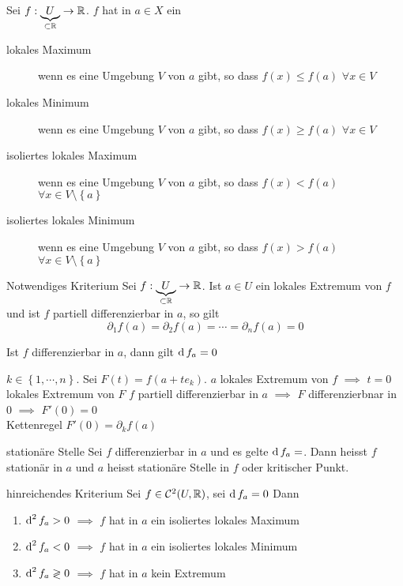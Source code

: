 \begin{Def}
  Sei $f:\underbrace{U}_{\subset\mathbb{R}}\to \mathbb{R}$. $f$ hat in $a\in X$ ein
  \begin{description}
    \item[lokales Maximum] wenn es eine Umgebung $V$ von $a$ gibt, so dass $f(x)\leq f(a)$ $\forall x\in V$
    \item[lokales Minimum] wenn es eine Umgebung $V$ von $a$ gibt, so dass $f(x)\geq f(a)$ $\forall x\in V$
    \item[isoliertes lokales Maximum] wenn es eine Umgebung $V$ von $a$ gibt, so dass $f(x)<f(a)$ $\forall x\in V\setminus \left\{ a \right\}$
    \item[isoliertes lokales Minimum] wenn es eine Umgebung $V$ von $a$ gibt, so dass $f(x)>f(a)$ $\forall x\in V\setminus\left\{ a \right\}$
  \end{description}
\end{Def}
\begin{Sat}{Notwendiges Kriterium}
  Sei $f:\underbrace{U}_{\subset\mathbb{R}}\to \mathbb{R}$. Ist $a\in U$ ein lokales Extremum von $f$ und ist $f$ partiell differenzierbar in $a$, so gilt
  \[\partial_1f(a)=\partial_2f(a)=\cdots=\partial_nf(a)=0\]
\end{Sat}
\begin{Bem}
  Ist $f$ differenzierbar in $a$, dann gilt $\operatorname{d} f_a=0$
\end{Bem}
\begin{Bew}
  $k\in \left\{ 1,\cdots,n \right\}$. Sei $F(t)=f(a+te_k)$. $a$ lokales Extremum von $f$ $\implies$ $t=0$ lokales Extremum von $F$ $f$ partiell differenzierbar in $a$ $\implies$ $F$ differenzierbnar in 0 $\implies$ $F'(0)=0$\\
  Kettenregel $F'(0)=\partial_kf(a)$
\end{Bew}
\begin{Def}{stationäre Stelle}
  Sei $f$ differenzierbar in $a$ und es gelte $\operatorname{d} f_a=$. Dann heisst $f$ stationär in $a$ und $a$ heisst stationäre Stelle in $f$ oder kritischer Punkt.
\end{Def}
\begin{Sat}{hinreichendes Kriterium}
  Sei $f\in\mathcal{C}^2(U,\mathbb{R})$, sei $\operatorname{d} f_a=0$ Dann
  \begin{enumerate}
    \item $\operatorname{d}^2f_a>0$ $\implies$ $f$ hat in $a$ ein isoliertes lokales Maximum
    \item $\operatorname{d}^2f_a<0$ $\implies$ $f$ hat in $a$ ein isoliertes lokales Minimum
    \item $\operatorname{d}^2f_a\gtrless0$ $\implies$ $f$ hat in $a$ kein Extremum
  \end{enumerate}
\end{Sat}
